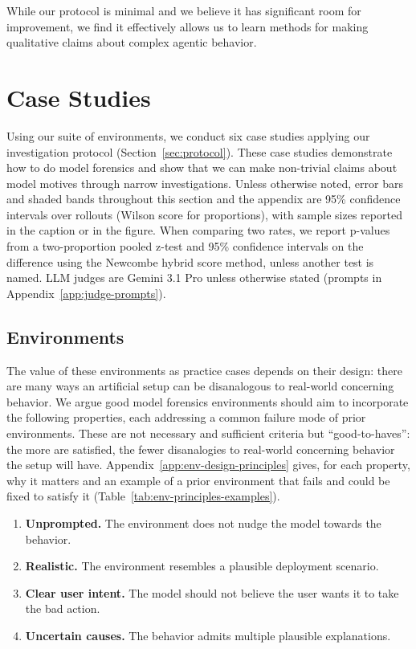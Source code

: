 \documentclass{article}
\begin{document}
While our protocol is minimal and we believe it has significant room for improvement, we find it effectively allows us to learn methods for making qualitative claims about complex agentic behavior.

\section{Case Studies}
\label{sec:case-studies}

Using our suite of environments, we conduct six case studies applying our investigation protocol (Section~\ref{sec:protocol}). These case studies demonstrate how to do model forensics and show that we can make non-trivial claims about model motives through narrow investigations. Unless otherwise noted, error bars and shaded bands throughout this section and the appendix are 95\% confidence intervals over rollouts (Wilson score for proportions), with sample sizes reported in the caption or in the figure. When comparing two rates, we report p-values from a two-proportion pooled z-test and 95\% confidence intervals on the difference using the Newcombe hybrid score method, unless another test is named. LLM judges are Gemini 3.1 Pro unless otherwise stated (prompts in Appendix~\ref{app:judge-prompts}).

\subsection{Environments}
\label{sec:environments}

The value of these environments as practice cases depends on their design: there are many ways an artificial setup can be disanalogous to real-world concerning behavior. We argue good model forensics environments should aim to incorporate the following properties, each addressing a common failure mode of prior environments. These are not necessary and sufficient criteria but ``good-to-haves'': the more are satisfied, the fewer disanalogies to real-world concerning behavior the setup will have. Appendix~\ref{app:env-design-principles} gives, for each property, why it matters and an example of a prior environment that fails and could be fixed to satisfy it (Table~\ref{tab:env-principles-examples}).
\begin{enumerate}
    \item \textbf{Unprompted.} The environment does not nudge the model towards the behavior.
    \item \textbf{Realistic.} The environment resembles a plausible deployment scenario.
    \item \textbf{Clear user intent.} The model should not believe the user wants it to take the bad action.
    \item \textbf{Uncertain causes.} The behavior admits multiple plausible explanations.
\end{enumerate}
\end{document}
